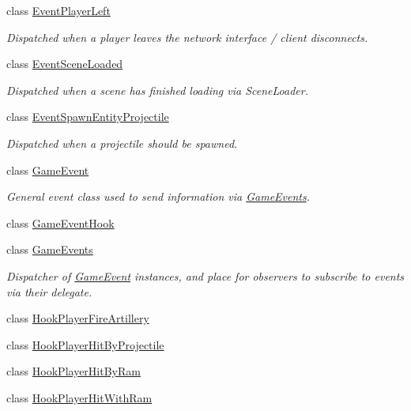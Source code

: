 \begin{DoxyCompactItemize}
class \hyperlink{class_skyrates_1_1_game_1_1_event_1_1_event_player_left}{Event\-Player\-Left}
\begin{DoxyCompactList}\small\item\em Dispatched when a player leaves the network interface / client disconnects. \end{DoxyCompactList}\item 
class \hyperlink{class_skyrates_1_1_game_1_1_event_1_1_event_scene_loaded}{Event\-Scene\-Loaded}
\begin{DoxyCompactList}\small\item\em Dispatched when a scene has finished loading via Scene\-Loader. \end{DoxyCompactList}\item 
class \hyperlink{class_skyrates_1_1_game_1_1_event_1_1_event_spawn_entity_projectile}{Event\-Spawn\-Entity\-Projectile}
\begin{DoxyCompactList}\small\item\em Dispatched when a projectile should be spawned. \end{DoxyCompactList}\item 
class \hyperlink{class_skyrates_1_1_game_1_1_event_1_1_game_event}{Game\-Event}
\begin{DoxyCompactList}\small\item\em General event class used to send information via \hyperlink{class_skyrates_1_1_game_1_1_event_1_1_game_events}{Game\-Events}. \end{DoxyCompactList}\item 
class \hyperlink{class_skyrates_1_1_game_1_1_event_1_1_game_event_hook}{Game\-Event\-Hook}
\item 
class \hyperlink{class_skyrates_1_1_game_1_1_event_1_1_game_events}{Game\-Events}
\begin{DoxyCompactList}\small\item\em Dispatcher of \hyperlink{class_skyrates_1_1_game_1_1_event_1_1_game_event}{Game\-Event} instances, and place for observers to subscribe to events via their delegate. \end{DoxyCompactList}\item 
class \hyperlink{class_skyrates_1_1_game_1_1_event_1_1_hook_player_fire_artillery}{Hook\-Player\-Fire\-Artillery}
\item 
class \hyperlink{class_skyrates_1_1_game_1_1_event_1_1_hook_player_hit_by_projectile}{Hook\-Player\-Hit\-By\-Projectile}
\item 
class \hyperlink{class_skyrates_1_1_game_1_1_event_1_1_hook_player_hit_by_ram}{Hook\-Player\-Hit\-By\-Ram}
\item 
class \hyperlink{class_skyrates_1_1_game_1_1_event_1_1_hook_player_hit_with_ram}{Hook\-Player\-Hit\-With\-Ram}
\end{DoxyCompactItemize}
